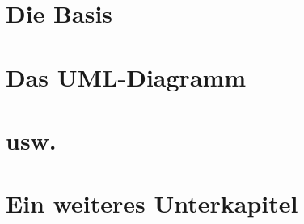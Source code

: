 \label{chapter:kap2}
\section{Die Basis}
\section{Das UML-Diagramm}
\section{usw.}
\section{Ein weiteres Unterkapitel}
